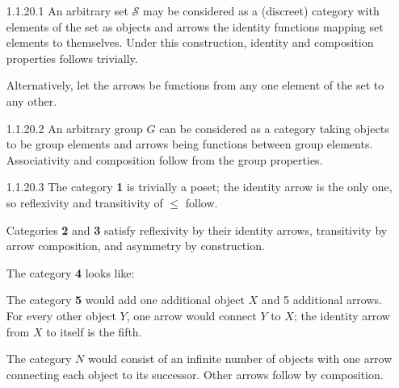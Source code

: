 \documentclass{article}
\begin{document}
\begin{enumerate}
\item[1.1.20.1]
  An arbitrary set $\mathcal{S}$ may be considered as a (discreet) category with elements of the set as objects and arrows the identity functions mapping set elements to themselves.
  Under this construction, identity and composition properties follows trivially.
  
  Alternatively, let the arrows be functions from any one element of the set to any other.

\item[]
\item[1.1.20.2]
  An arbitrary group $G$ can be considered as a category taking objects to be group elements and arrows being functions between group elements.
  Associativity and composition follow from the group properties.

\item[]
\item[1.1.20.3]
  The category \textbf{1} is trivially a poset; the identity arrow is the only one, so reflexivity and transitivity of $\le$ follow.
  
  Categories \textbf{2} and \textbf{3} satisfy reflexivity by their identity arrows, transitivity by arrow composition, and asymmetry by construction.

  The category \textbf{4} looks like:

  \begin{center}
  \end{center}

  The category \textbf{5} would add one additional object $X$ and 5 additional arrows.
  For every other object $Y$, one arrow would connect $Y$ to $X$; the identity arrow from $X$ to itself is the fifth.

  The category $N$ would consist of an infinite number of objects with one arrow connecting each object to its successor.
  Other arrows follow by composition.


\end{enumerate}
\end{document}
